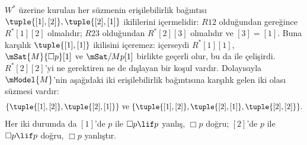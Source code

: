 \documentclass[../../../include/open-logic-section]{subfiles}
\begin{document}
\begin{ex}
  $W^*$ üzerine kurulan her süzmenin erişilebilirlik bağıntısı
  $\tuple{[1], [2]}, \tuple{[2],[1]}$ ikililerini içermelidir:
  $R12$ olduğundan
   gereğince
  $R^*[1][2]$ olmalıdır; $R23$ olduğundan $R^*[2][3]$ olmalıdır ve
  $[3]=[1]$. Buna karşılık $\tuple{[1],[1]}$ ikilisini içeremez: içerseydi
  $R^*[1][1]$, $\mSat{M}{\Box p}[1]$ ve $\mSat/{M}{p}[1]$ birlikte
  geçerli olur, bu da  ile çelişirdi.
  $R^*[2][2]$'yi ne gerektiren ne de dışlayan bir koşul vardır. Dolayısıyla
  $\mModel{M}$'nin aşağıdaki iki erişilebilirlik bağıntısına karşılık gelen
  iki olası süzmesi vardır:
  \[
  \{\tuple{[1],[2]}, \tuple{[2],[1]}\} \text{ ve }
  \{\tuple{[1],[2]}, \tuple{[2],[1]}, \tuple{[2],[2]}\}.
  \]
  Her iki durumda da $[1]$'de $p$ ile $\Box p \lif p$ yanlış,
  $\Box p$ doğru; $[2]$'de $p$ ile $\Box p \lif p$ doğru,
  $\Box p$ yanlıştır.
\end{ex}
\end{document}

